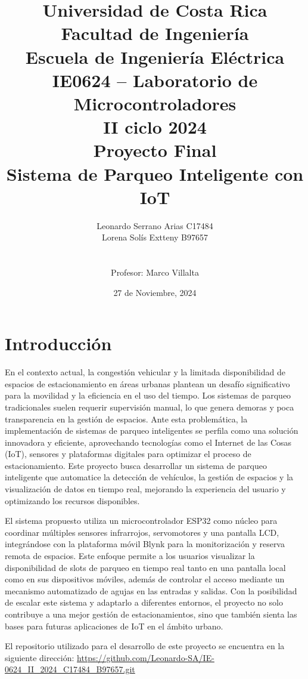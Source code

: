 \documentclass[12pt,a4paper]{article}
\author{ Leonardo Serrano Arias C17484  \\Lorena Solís Extteny B97657\\{\small }\\ \\ Profesor: Marco Villalta  \vspace*{3.0in}}
\title{Universidad de Costa Rica\\{\small Facultad de Ingeniería\\Escuela de Ingeniería Eléctrica\\IE0624 – Laboratorio de Microcontroladores\\II ciclo 2024\\\vspace*{0.55in} Proyecto Final }\\ Sistema de Parqueo Inteligente con IoT\vspace*{1.35in}}
\date{27 de Noviembre, 2024}
\begin{document}
 

\maketitle  
\thispagestyle{empty}%
\renewcommand{\thepage}{\roman{page}}
\newpage
\tableofcontents

\listoffigures 


\renewcommand{\thepage}{\arabic{page}} 
\setcounter{page}{1}

\newpage
\section{Introducción}
En el contexto actual, la congestión vehicular y la limitada disponibilidad de espacios de estacionamiento en áreas urbanas plantean un desafío significativo para la movilidad y la eficiencia en el uso del tiempo. Los sistemas de parqueo tradicionales suelen requerir supervisión manual, lo que genera demoras y poca transparencia en la gestión de espacios. Ante esta problemática, la implementación de sistemas de parqueo inteligentes se perfila como una solución innovadora y eficiente, aprovechando tecnologías como el Internet de las Cosas (IoT), sensores y plataformas digitales para optimizar el proceso de estacionamiento. Este proyecto busca desarrollar un sistema de parqueo inteligente que automatice la detección de vehículos, la gestión de espacios y la visualización de datos en tiempo real, mejorando la experiencia del usuario y optimizando los recursos disponibles.

El sistema propuesto utiliza un microcontrolador ESP32 como núcleo para coordinar múltiples sensores infrarrojos, servomotores y una pantalla LCD, integrándose con la plataforma móvil Blynk para la monitorización y reserva remota de espacios. Este enfoque permite a los usuarios visualizar la disponibilidad de slots de parqueo en tiempo real tanto en una pantalla local como en sus dispositivos móviles, además de controlar el acceso mediante un mecanismo automatizado de agujas en las entradas y salidas. Con la posibilidad de escalar este sistema y adaptarlo a diferentes entornos, el proyecto no solo contribuye a una mejor gestión de estacionamientos, sino que también sienta las bases para futuras aplicaciones de IoT en el ámbito urbano.

El repositorio utilizado para el desarrollo de este proyecto se encuentra en la siguiente dirección: \url{https://github.com/Leonardo-SA/IE-0624_II_2024_C17484_B97657.git}
\end{document}
